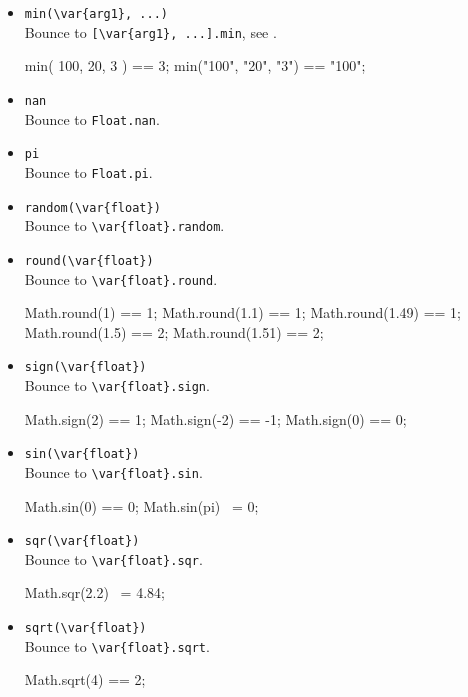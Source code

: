 \begin{itemize}
\item \lstinline|min(\var{arg1}, ...)|\\
  Bounce to \lstinline|[\var{arg1}, ...].min|, see .
\begin{urbiassert}
min( 100,   20,   3 ) ==     3;
min("100", "20", "3") == "100";
\end{urbiassert}

\item \lstinline|nan|\\
  Bounce to \lstinline|Float.nan|.

\item \lstinline|pi|\\
  Bounce to \lstinline|Float.pi|.

\item \lstinline|random(\var{float})|\\
  Bounce to \lstinline|\var{float}.random|.

\item \lstinline|round(\var{float})|\\
  Bounce to \lstinline|\var{float}.round|.
\begin{urbiassert}
Math.round(1) == 1;
Math.round(1.1) == 1;
Math.round(1.49) == 1;
Math.round(1.5) == 2;
Math.round(1.51) == 2;
\end{urbiassert}

\item \lstinline|sign(\var{float})|\\
  Bounce to \lstinline|\var{float}.sign|.
\begin{urbiassert}
Math.sign(2)  == 1;
Math.sign(-2) == -1;
Math.sign(0)  == 0;
\end{urbiassert}

\item \lstinline|sin(\var{float})|\\
  Bounce to \lstinline|\var{float}.sin|.
\begin{urbiassert}
Math.sin(0) == 0;
Math.sin(pi) ~= 0;
\end{urbiassert}

\item \lstinline|sqr(\var{float})|\\
  Bounce to \lstinline|\var{float}.sqr|.
\begin{urbiassert}
Math.sqr(2.2) ~= 4.84;
\end{urbiassert}

\item \lstinline|sqrt(\var{float})|\\
  Bounce to \lstinline|\var{float}.sqrt|.
\begin{urbiassert}
Math.sqrt(4) == 2;
\end{urbiassert}


\end{itemize}
